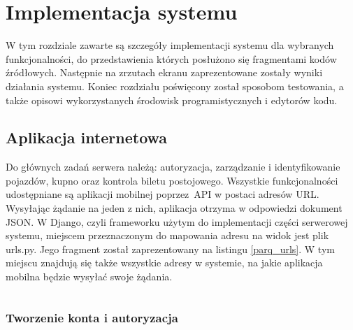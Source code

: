 \setcounter{listing}{0}

\section{Implementacja systemu}

W tym rozdziale zawarte są szczegóły implementacji systemu dla wybranych funkcjonalności, do przedstawienia których posłużono się fragmentami kodów źródłowych. Następnie na zrzutach ekranu zaprezentowane zostały wyniki działania systemu. Koniec rozdziału poświęcony został sposobom testowania, a także opisowi wykorzystanych środowisk programistycznych i edytorów kodu.

\subsection{Aplikacja internetowa}

Do głównych zadań serwera należą: autoryzacja, zarządzanie i identyfikowanie pojazdów, kupno oraz kontrola biletu postojowego. Wszystkie funkcjonalności udostępniane są aplikacji mobilnej poprzez API w postaci adresów URL. Wysyłając żądanie na jeden z nich, aplikacja otrzyma w odpowiedzi dokument JSON. W Django, czyli frameworku użytym do implementacji części serwerowej systemu, miejscem przeznaczonym do mapowania adresu na widok jest plik urls.py. Jego fragment został zaprezentowany na listingu \ref{parq_urls}. W tym miejscu znajdują się także wszystkie adresy w systemie, na jakie aplikacja mobilna będzie wysyłać swoje żądania.

\begin{singlespace}
	\label{parq_urls}
	\vspace{0.3cm}
	\inputminted[fontsize=\footnotesize]{python}{src/imp/urlpatterns.py}
\end{singlespace}

\subsubsection*{Tworzenie konta i autoryzacja}


